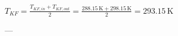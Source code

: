 \( T_{KF} = \frac{T_{KF,in} + T_{KF,out}}{2} = \frac{288.15 \, \text{K} + 298.15 \, \text{K}}{2} = 293.15 \, \text{K} \)  

---